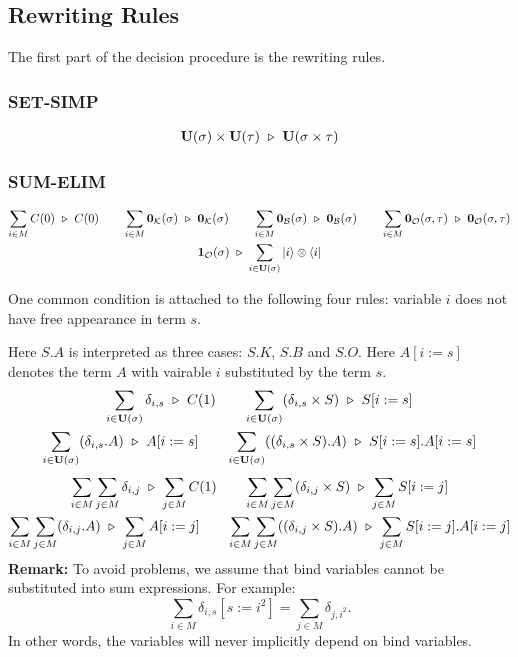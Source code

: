 \subsection{Rewriting Rules}
The first part of the decision procedure is the rewriting rules.

\subsubsection*{\textsf{SET-SIMP}}
\begin{gather*}
  \mathbf{U}(\sigma) \times \mathbf{U}(\tau) \ \triangleright\  \mathbf{U}(\sigma \times \tau)
\end{gather*}

\subsubsection*{\textsf{SUM-ELIM}}
\begin{gather*}
  \sum_{i \in M} C(0) \ \triangleright\  C(0)
  \qquad
  \sum_{i \in M} \mathbf{0}_\mathcal{K}(\sigma) \ \triangleright\  \mathbf{0}_\mathcal{K}(\sigma)
  \qquad
  \sum_{i \in M} \mathbf{0}_\mathcal{B}(\sigma) \ \triangleright\  \mathbf{0}_\mathcal{B}(\sigma)
  \qquad
  \sum_{i \in M} \mathbf{0}_\mathcal{O}(\sigma, \tau) \ \triangleright\  \mathbf{0}_\mathcal{O}(\sigma, \tau)\\
  \mathbf{1}_\mathcal{O}(\sigma) \ \triangleright\  \sum_{i \in \mathbf{U}(\sigma)} \ket{i}\otimes\bra{i}
\end{gather*}

One common condition is attached to the following four rules: variable $i$ does not have free appearance in term $s$.

Here $S.A$ is interpreted as three cases: $S.K$, $S.B$ and $S.O$. Here $A[i:=s]$ denotes the term $A$ with vairable $i$ substituted by the term $s$.
\begin{gather*}
  \sum_{i \in \mathbf{U}(\sigma)} \delta_{i, s} \ \triangleright\  C(1)
  \qquad
  \sum_{i \in \mathbf{U}(\sigma)} (\delta_{i, s} \times S) \ \triangleright\  S[i:=s] \\
  \sum_{i \in \mathbf{U}(\sigma)} (\delta_{i, s}.A) \ \triangleright\  A[i:=s]
  \qquad
  \sum_{i \in \mathbf{U}(\sigma)} ((\delta_{i, s} \times S).A) \ \triangleright\  S[i:=s].A[i:=s]
\end{gather*}
\begin{gather*}
  \sum_{i \in M} \sum_{j \in M} \delta_{i, j} \ \triangleright\  \sum_{j \in M} C(1)
  \qquad
  \sum_{i \in M} \sum_{j \in M} (\delta_{i, j} \times S) \ \triangleright\  \sum_{j \in M} S[i:=j] \\
  \sum_{i \in M} \sum_{j \in M} (\delta_{i, j}.A) \ \triangleright\  \sum_{j \in M} A[i:=j]
  \qquad
  \sum_{i \in M} \sum_{j \in M} ((\delta_{i, j} \times S).A) \ \triangleright\  \sum_{j \in M} S[i:=j].A[i:=j]
\end{gather*}
\textbf{Remark:} To avoid problems, we assume that bind variables cannot be substituted into sum expressions. For example:
$$
\sum_{i \in M} \delta_{i, s}[s:=i^2] = \sum_{j \in M} \delta_{j, i^2}.
$$
In other words, the variables will never implicitly depend on bind variables.

